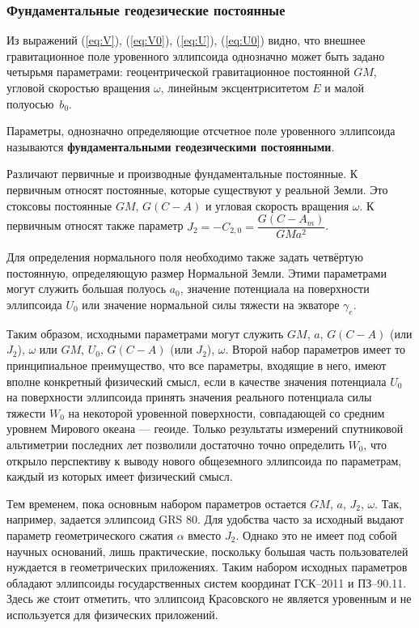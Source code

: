 \documentclass[11pt, a4paper,addpoints]{exam}
\theoremstyle{remark}
\begin{document}
\subsubsection*{Фундаментальные геодезические постоянные}
Из выражений (\ref{eq:V}), (\ref{eq:V0}), (\ref{eq:U}), (\ref{eq:U0}) видно, что внешнее
гравитационное поле уровенного эллипсоида однозначно может быть задано четырьмя параметрами: геоцентрической
гравитационное постоянной $GM$, угловой скоростью вращения $\omega$, линейным
эксцентриситетом $E$ и малой полуосью~$b_0$.

Параметры, однозначно определяющие отсчетное поле уровенного эллипсоида называются
\textbf{фундаментальными геодезическими постоянными}.

Различают первичные и производные фундаментальные постоянные. К первичным относят постоянные,
которые существуют у реальной Земли. Это стоксовы постоянные $GM$, $G\left( C - A \right)$ и угловая
скорость вращения $\omega$. К первичным относят также параметр $J_2 = - C_{2,0} = \dfrac{G\left( C -
A_m\right)}{GMa^2}$.

Для определения нормального поля необходимо также задать четвёртую постоянную, определяющую размер
Нормальной Земли. Этими параметрами могут служить большая полуось $a_0$, значение потенциала на
поверхности эллипсоида $U_0$ или значение нормальной силы тяжести на экваторе $\gamma_e$.

Таким образом, исходными параметрами могут служить $GM$, $a$, $G\left( C - A \right)$ (или $J_2$), 
$\omega$ или $GM$, $U_0$, $G\left( C -
A\right)$ (или $J_2$), $\omega$. Второй набор параметров имеет то принципиальное преимущество, что
все параметры, входящие в него, имеют вполне конкретный физический смысл, если в качестве значения
потенциала $U_0$ на поверхности эллипсоида принять значения реального потенциала силы тяжести $W_0$ на некоторой
уровенной поверхности, совпадающей со средним уровнем Мирового океана --- геоиде. Только результаты
измерений спутниковой альтиметрии последних лет позволили достаточно точно определить $W_0$, 
что открыло перспективу к выводу нового общеземного эллипсоида по параметрам, каждый из которых имеет 
физический смысл.

Тем временем, пока основным набором параметров остается $GM$, $a$, $J_2$, $\omega$. 
Так, например, задается эллипсоид GRS 80. Для удобства часто за исходный выдают 
параметр геометрического сжатия $\alpha$ вместо $J_2$. Однако это не имеет под собой научных
оснований, лишь практические, поскольку большая часть пользователей нуждается в геометрических
приложениях. Таким набором исходных параметров обладают эллипсоиды государственных систем координат 
ГСК--2011 и ПЗ--90.11. Здесь же стоит отметить, что эллипсоид Красовского не является уровенным и
не используется для физических приложений.
\end{document}
